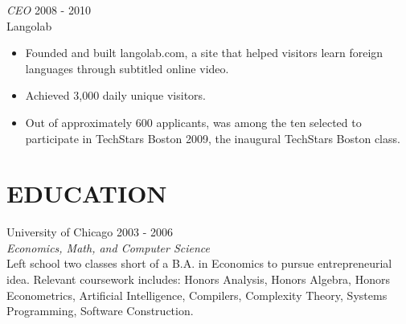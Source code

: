 \documentclass[overlapped, 10pt]{res} %
\begin{document}
\begin{resume}
{\sl CEO} \hfill 2008 - 2010 \\
Langolab
\begin{itemize}
\item Founded and built langolab.com, a site that helped visitors learn foreign languages through subtitled online video.
\item Achieved 3,000 daily unique visitors.
\item Out of approximately 600 applicants, was among the ten selected to participate in TechStars Boston 2009, the inaugural TechStars Boston class.
\end{itemize}


\section{EDUCATION} 

University of Chicago \hfill 2003 - 2006 \\
{\sl Economics, Math, and Computer Science}\vspace{2pt}\\
Left school two classes short of a B.A. in Economics to pursue entrepreneurial idea. Relevant coursework includes: Honors Analysis, Honors Algebra, Honors Econometrics, Artificial Intelligence, Compilers, Complexity Theory, Systems Programming, Software Construction.
 


\end{resume}
\end{document}
